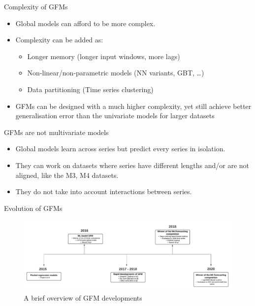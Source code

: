 \documentclass{beamer}
\begin{document}
 \begin{frame}{Complexity of GFMs}
  	\begin{itemize}
  	\item  Global models can afford to be more complex.
  	\vspace{2.0mm}	  
  	\item Complexity can be added as:
  	\begin{itemize}\color{blue}
		\item Longer memory (longer input windows, more lags)
		\item Non-linear/non-parametric models (NN variants, GBT, …)
		\item Data partitioning (Time series clustering)
	  \end{itemize}
	  \vspace{2.0mm}
	  \item GFMs can be designed with a much higher complexity, yet still achieve better generalisation error than the univariate models for larger datasets \cite{Montero-Manso2021-es}
 	\end{itemize}
   \end{frame}  
   
 \begin{frame}{GFMs are not multivariate models}
  	\begin{itemize}
  	\item  Global models learn across series but predict every series in isolation.
	  \vspace{2.0mm}
	  \item They can work on datasets where series have different lengths and/or are not aligned, like the M3, M4 datasets.
	   \vspace{2.0mm}
	\item They do not take into account interactions between series.
 	\end{itemize}
   \end{frame}   
   
 \begin{frame}{Evolution of GFMs}
  	\begin{figure}
   \includegraphics[scale=0.35]{images/timeline}
   \caption{\tiny{A brief overview of GFM developments}}
  \end{figure}
  \end{frame}
  
\end{document}
